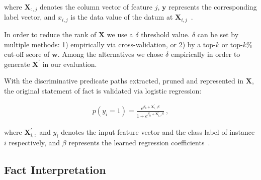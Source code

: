\documentclass[reprint,twocolumn,showpacs,preprintnumbers,amsmath, aps,pre,amssymb]{revtex4-1}
\begin{document}
\noindent where $\mathbf{X}_{:,j}$ denotes the column vector of feature $j$, $\mathbf{y}$ represents the corresponding label vector, and $x_{i,j}$ is the data value of the datum at $\mathbf{X}_{i,j}$~\cite{Quinlan2014}. 

In order to reduce the rank of $\mathbf{X}$ we use a $\delta$ threshold value. $\delta$ can be set by multiple methods: 1) empirically via cross-validation, or 2) by a top-$k$ or top-$k\%$ cut-off score of $\mathbf{w}$. Among the alternatives we chose $\delta$ empirically in order to generate $\mathbf{X^\prime}$ in our evaluation.


With the discriminative predicate paths extracted, pruned and represented in $\mathbf{X}$, the original statement of fact is validated via logistic regression:

\begin{equation}
\begin{split}
    p(y_i = 1) = \frac{e^{\beta_0 + \mathbf{X}^\prime_{i,:}\beta}}{1 + e^{\beta_0 + \mathbf{X}^\prime_{i,:}\beta}} \ ,
\end{split}
\end{equation}

\noindent where $\mathbf{X}^\prime_{i,:}$ and $y_i$ denotes the input feature vector and the class label of instance $i$ respectively, and $\beta$ represents the learned regression coefficients~\cite{Murphy2012}.


\subsection{Fact Interpretation} \label{sec:fact_interpertation}

\end{document}
